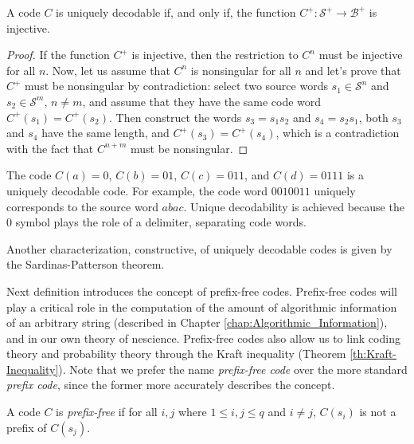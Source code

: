 \begin{proposition}
A code $C$ is uniquely decodable if, and only if, the function $C^{+}:\mathcal{S}^{+}\rightarrow\mathcal{B}^{+}$ is injective.
\end{proposition}
\begin{proof}
If the function $C^{+}$ is injective, then the restriction to $C^{n}$ must be injective for all $n$. Now, let us assume that $C^{n}$ is nonsingular for all $n$ and let's prove that $C^{+}$ must be nonsingular by contradiction: select two source words $s_{1} \in \mathcal{S}^{n}$ and $s_{2} \in \mathcal{S}^{m}$, $n \neq m$, and assume that they have the same code word $C^{+}(s_{1}) = C^{+}(s_{2})$. Then construct the words $s_{3} = s_{1}s_{2}$ and $s_{4} = s_{2}s_{1}$, both $s_{3}$ and $s_{4}$ have the same length, and $C^{+}(s_{3}) = C^{+}(s_{4})$, which is a contradiction with the fact that $C^{n+m}$ must be nonsingular.
\end{proof}

\begin{example}
\label{ex:uniquely-decodable}
The code $C(a)=0$, $C(b)=01$, $C(c)=011$, and $C(d)=0111$ is a uniquely decodable code. For example, the code word $0010011$ uniquely corresponds to the source word $abac$. Unique decodability is achieved because the $0$ symbol plays the role of a delimiter, separating code words.
\end{example}

{\color{red} Another characterization, constructive, of uniquely decodable codes is given by the Sardinas-Patterson theorem.}

Next definition introduces the concept of prefix-free codes. Prefix-free codes will play a critical role in the computation of the amount of algorithmic information of an arbitrary string (described in Chapter \ref{chap:Algorithmic_Information}), and in our own theory of nescience. Prefix-free codes also allow us to link coding theory and probability theory through the Kraft inequality (Theorem \ref{th:Kraft-Inequality}). Note that we prefer the name \emph{prefix-free code} over the more standard \emph{prefix code}, since the former more accurately describes the concept.

\begin{definition}
\label{def:Prefix-free-Code}
A code $C$ is \emph{prefix-free} if for all $i, j$ where $1 \leq i, j \leq q$ and $i \neq j$, $C(s_i)$ is not a prefix of $C(s_j)$.
\end{definition}

